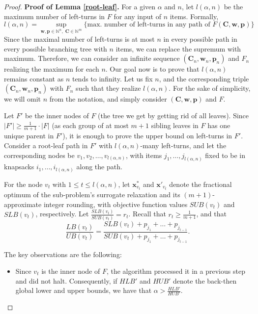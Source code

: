 \documentclass[moor,sglanonrev]{informs4}
\theoremstyle{plain}
\begin{document}
\begin{proof}{\textbf{Proof of Lemma \ref{root-leaf}.}}
    For a given $\alpha$ and $n$, let $l(\alpha, n)$ be the maximum number of left-turns in $F$ for any input of $n$ items. Formally,
    \[
    l(\alpha, n) = \sup_{\bm{w}, \bm{p} \in \mathbb{N}^n, \; \bm{C} \in \mathbb{N}^m} \{\text{max. number of left-turns in any path of } F(\bm{C}, \bm{w}, \bm{p})\}
    \]
    Since the maximal number of left-turns is at most $n$ in every possible path in every possible branching tree with $n$ items, we can replace the supremum with maximum. Therefore, we can consider an infinite sequence $(\bm{C}_n, \bm{w}_n, \bm{p}_n)$ and $F_n$ realizing the maximum for each $n$. Our goal now is to prove that $l(\alpha, n)$ remains constant as $n$ tends to infinity. Let us fix $n$, and the corresponding triple $(\bm{C}_n, \bm{w}_n, \bm{p}_n)$ with $F_n$ such that they realize $l(\alpha, n)$. For the sake of simplicity, we will omit $n$ from the notation, and simply consider $(\bm{C}, \bm{w}, \bm{p})$ and $F$.

    Let $F'$ be the inner nodes of $F$ (the tree we get by getting rid of all leaves). Since $|F'| \ge \frac{1}{m+1} \cdot |F|$ (as each group of at most $m+1$ sibling leaves in $F$ has one unique parent in $F'$), it is enough to prove the upper bound on left-turns in $F'$. Consider a root-leaf path in $F'$ with $l(\alpha, n)$-many left-turns, and let the corresponding nodes be $v_1, v_2, \ldots, v_{l(\alpha, n)}$, with items $j_1, \ldots, j_{l(\alpha,n)}$ fixed to be in knapsacks $i_1, \ldots, i_{l(\alpha, n)}$ along the path.

    For the node $v_t$ with $1\le t\le l(\alpha, n)$, let $\bm{x}^* _{v_t}$ and $\bm{x}'_{v_t}$ denote the fractional optimum of the sub-problem's surrogate relaxation and its $(m+1)$-approximate integer rounding, with objective function values $SUB(v_t)$ and $SLB(v_t)$, respectively. Let $\frac{SLB(v_t)}{SUB(v_t)} = r_t$. Recall that $r_t \ge \frac{1}{m+1}$, and that 
    \[
    \frac{LB(v_t)}{UB(v_t)} = \frac{SLB(v_t) + p_{j_1} + \ldots + p_{j_{t-1}}}{SUB(v_t) + p_{j_1} + \ldots + p_{j_{t-1}}}.
    \]
    
    The key observations are the following:
    \begin{itemize}
        \item Since $v_t$ is the inner node of $F$, the algorithm processed it in a previous step and did not halt. Consequently, if $HLB'$ and $HUB'$ denote the back-then global lower and upper bounds, we have that $\alpha > \frac{HLB'}{HUB'}$.
        

\end{itemize}
\end{proof}
\end{document}
